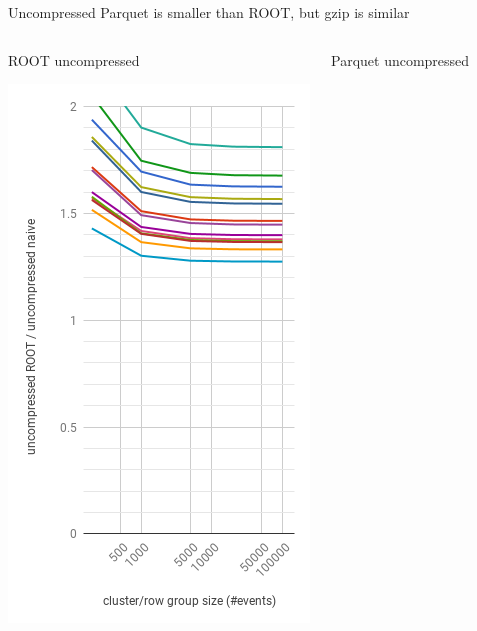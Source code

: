 \documentclass[aspectratio=169]{beamer}
\begin{document}
\begin{frame}{Uncompressed Parquet is smaller than ROOT, but gzip is similar}
\vspace{-0.1 cm}
\begin{columns}
\begin{center}
ROOT uncompressed

\includegraphics[width=\linewidth]{root-none.png}
\end{center}
\begin{center}
Parquet uncompressed


\end{center}
\end{columns}
\end{frame}
\end{document}
